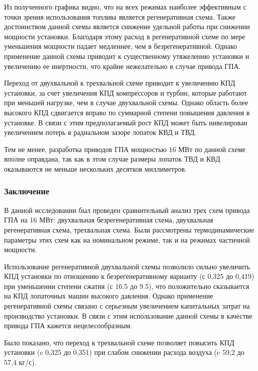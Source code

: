Из полученного графика видно, что на всех режимах наиболее эффективным с точки зрения использования топлива является регенеративная схема. Также достоинством данной схемы является снижение удельной работы при снижении мощности установки. Благодаря этому расход в регенеративной схеме по мере уменьшения мощности падает медленнее, чем в безрегенеративной. Однако применение данной схемы приводит к существенному утяжелению установки и увеличению ее инертности, что крайне нежелательно в случае привода ГПА. 

Переход от двухвальной к трехвальной схеме приводит к увеличению КПД установки, за счет увеличения КПД компрессоров и турбин, которые работают при меньшей нагрузке, чем в случае двухвальной схемы. Однако область более высокого КПД сдвигается вправо по суммарной степени повышения давления в установке. В связи с этим предполагаемый рост КПД может быть нивелирован увеличением потерь в радиальном зазоре лопаток КВД и ТВД.

Тем не менее, разработка приводов ГПА мощностью 16 МВт по данной схеме вполне оправдана, так как в этом случае размеры лопаток ТВД и КВД оказываются не меньше нескольких десятков миллиметров.


\subsubsection{Заключение}

В данной исследовании был проведен сравнительный анализ трех схем привода ГПА на 16 МВт: двухвальная безрегенеративная схема, двухвальная регенеративная схема, трехвальная схема. Были рассмотрены термодинамические параметры этих схем как на номинальном режиме, так и на режимах частичной мощности.

Использование регенеративной двухвальной схемы позволило сильно увеличить КПД установки по отношению к безрегенеративному варианту (с 0,325 до 0,419) при уменьшении степени сжатия (с 16.5 до 9.5), что положительно сказывается на КПД лопаточных машин высокого давления. Однако применение регенеративной схемы связано с серьезным увеличением капитальных затрат на производство установки. В связи с этим использование данной схемы в качестве привода ГПА кажется нецелесообразным.
 
 Было показано, что переход к трехвальной схеме позволяет повысить КПД установки (c 0,325 до 0,351) при слабом снижении расхода воздуха (c 59,2 до 57,4 кг/с).
